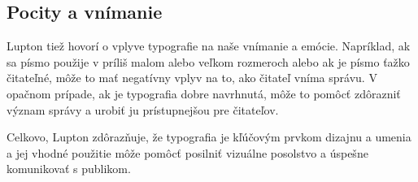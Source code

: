 \documentclass[a4paper, 11pt]{article}
\begin{document}
\subsection{Pocity a vnímanie}
Lupton tiež hovorí o vplyve typografie na naše vnímanie a emócie. Napríklad, ak sa písmo použije v príliš malom alebo veľkom rozmeroch alebo ak je písmo ťažko čitateľné, môže to mať negatívny vplyv na to, ako čitateľ vníma správu. V opačnom prípade, ak je typografia dobre navrhnutá, môže to pomôcť zdôrazniť význam správy a urobiť ju prístupnejšou pre čitateľov.

Celkovo, Lupton zdôrazňuje, že typografia je kľúčovým prvkom dizajnu a umenia a jej vhodné použitie môže pomôcť posilniť vizuálne posolstvo a úspešne komunikovať s publikom. \cite{LUPTON}







\newpage

\renewcommand{\refname}{Literatúra}

\end{document}
